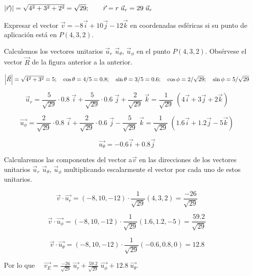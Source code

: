 $\abs{\vec r)}=\sqrt{4^2+3^2+2^2}=\sqrt{29};\qquad \vec r = r\; \vec u_r=29\; \vec u_r$

\begin{ejem}
	Expresar el vector $\vec v=-8\vec i+10 \vec j - 12 \vec k$ en coordenadas esféricas si su punto de aplicación está en $P(4,3,2)$.
\end{ejem}

Calculemos los vectores unitarios $\vec u_{r}$ $\vec u_{\theta}$, $\vec u_{\phi}$ en el punto $P(4,3,2)$. Obsérvese el vector $\vec R$ de la figura anterior a la anterior.

$\abs{\vec R}=\sqrt{4^2+3^2}=5; \quad \cos \theta =4/5=0.8;\quad \sin \theta=3/5=0.6;\quad \cos \phi=2/\sqrt{29};\quad \sin \phi=5/\sqrt{29}$

$$\vec u_r=\dfrac 5 {\sqrt{29}}\cdot 0.8 \; \vec i+\dfrac 5 {\sqrt{29}}\cdot 0.6 \; \vec j + \dfrac 2 {\sqrt{29}}\; \vec k = \dfrac  1{\sqrt{29}}\; (4\vec i+3\vec j+2\vec k)$$

$$ \vec {u_{\phi}}=\dfrac 2 {\sqrt{29}}\cdot 0.8 \;  \vec i + \dfrac 2 {\sqrt{29}}\cdot 0.6 \; \vec j - \dfrac 5 {\sqrt{29}}\; \vec k =
	\dfrac  1{\sqrt{29}}\; (1.6\vec i+1.2\vec j-5\vec k)$$

$$\vec {u_{\theta}}=-0.6\vec i+0.8 \vec j$$

Calcularemos las componentes del vector a$\vec v$ en las direcciones de los vectores unitarios $\vec u_{r}$ $\vec u_{\theta}$, $\vec u_{\phi}$ multiplicando escalarmente el vector por cada uno de estos unitarios.

$$ \vec v \cdot \vec {u_{r}}= (-8,10,-12)\cdot \frac 1 {\sqrt{29}} (4,3,2)=\frac {-26}{\sqrt{29}}$$ 

$$ \vec v \cdot \vec {u_{\phi}}= (-8,10,-12)\cdot \frac 1 {\sqrt{29}} (1.6,1.2,-5)=\frac {59.2}{\sqrt{29}}$$

$$ \vec v \cdot \vec {u_{\theta}}= (-8,10,-12)\cdot \frac 1 {\sqrt{29}} (-0.6,0.8,0)=12.8$$

Por lo que $\quad \vec {v_E}=\frac {-26}{\sqrt{29}}\; \vec {u_{r}}+ \frac {59.2}{\sqrt{29}}\; \vec {u_{\phi}}+ 12.8\; \vec {u_{\theta}}$.

\newpage %
\chapter*{} 
 
$\quad$ 
	